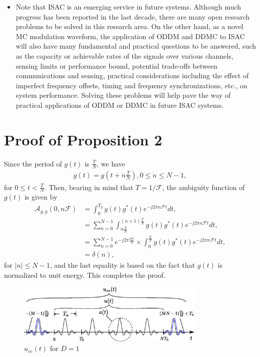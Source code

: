 \documentclass[journal]{IEEEtran}
\begin{document}
{\begin{itemize}
  \item  Note that ISAC is an emerging service in future systems. Although much progress has been reported in the last decade, there are many open research problems to be solved in this research area. On the other hand, as a novel MC modulation waveform, the application of ODDM and DDMC to ISAC will also have many fundamental and practical questions to be answered, such as the capacity or achievable rates of the signals over various channels, sensing limits or performance bound, potential trade-offs between communications and sensing, practical considerations including the effect of imperfect frequency {offsets}, timing and frequency synchronizations, etc., on system performance. Solving these problems will help pave the way of practical {applications} of ODDM or DDMC in future ISAC systems.
\end{itemize}



\appendices
\section{Proof of Proposition 2}
Since the period of $g(t)$ is $\frac{T}{N}$, we have
\begin{align}
  g(t)=g(t+\dot n\frac{T}{N}), 0 \le \dot n \le N-1,
\end{align}
for $0\le  t < \frac{T}{N}$.
Then, bearing in mind that $T=1/\mathcal F$, the ambiguity function of $g(t)$ is given by
\begin{align}
  \mathcal A_{g,g}(0,n\mathcal F) & =  \int_0^{T_g} g(t)g^*(t)e^{-j2\pi n\mathcal Ft} dt, \nonumber                                                                 \\
                                  & = \sum_{\dot n=0}^{N-1} \int_{\dot n \frac{T}{N}} ^{(\dot n+1) \frac{T}{N}} g(t)g^*(t)e^{-j2\pi n\mathcal Ft} dt, \nonumber     \\
                                  & = \sum_{\dot n=0}^{N-1} e^{-j2\pi\frac{n\dot n}{N}} \times \int_0^{\frac{T}{N}} g(t)g^*(t)e^{-j2\pi n\mathcal Ft} dt, \nonumber \\
                                  & = \delta(n),
\end{align}
for $|n|\le N-1$, {and the last equality is based on the fact that $g(t)$ is normalized to unit energy. This completes the proof}.


\begin{figure}
  \centering
  \includegraphics[width=9cm]{uce11}
  \caption{$u_{ce}(t)$ for $D=1$}
  \label{gce1}
\end{figure}

}
\end{document}
